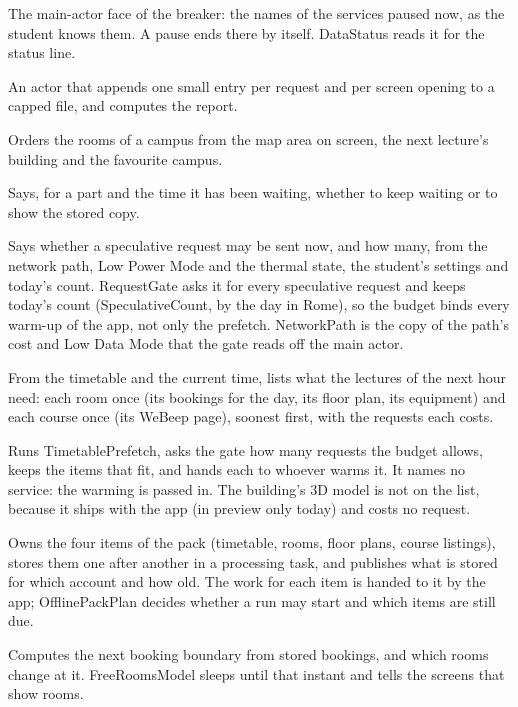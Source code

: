 \begin{description}[style=nextline, leftmargin=1.5em]
  \item[HostPauses (new)] The main-actor face of the breaker: the names of the services paused now, as the student knows them. A pause ends there by itself. DataStatus reads it for the status line.
  \item[LoadingLedger (new)] An actor that appends one small entry per request and per screen opening to a capped file, and computes the report.
  \item[RelevanceOrder (new)] Orders the rooms of a campus from the map area on screen, the next lecture's building and the favourite campus.
  \item[DeadlinePolicy (new)] Says, for a part and the time it has been waiting, whether to keep waiting or to show the stored copy.
  \item[SpeculativeBudget (new)] Says whether a speculative request may be sent now, and how many, from the network path, Low Power Mode and the thermal state, the student's settings and today's count. RequestGate asks it for every speculative request and keeps today's count (SpeculativeCount, by the day in Rome), so the budget binds every warm-up of the app, not only the prefetch. NetworkPath is the copy of the path's cost and Low Data Mode that the gate reads off the main actor.
  \item[TimetablePrefetch (new)] From the timetable and the current time, lists what the lectures of the next hour need: each room once (its bookings for the day, its floor plan, its equipment) and each course once (its WeBeep page), soonest first, with the requests each costs.
  \item[LecturePrefetch (new)] Runs TimetablePrefetch, asks the gate how many requests the budget allows, keeps the items that fit, and hands each to whoever warms it. It names no service: the warming is passed in. The building's 3D model is not on the list, because it ships with the app (in preview only today) and costs no request.
  \item[OfflinePack (new)] Owns the four items of the pack (timetable, rooms, floor plans, course listings), stores them one after another in a processing task, and publishes what is stored for which account and how old. The work for each item is handed to it by the app; OfflinePackPlan decides whether a run may start and which items are still due.
  \item[BoundaryClock (new)] Computes the next booking boundary from stored bookings, and which rooms change at it. FreeRoomsModel sleeps until that instant and tells the screens that show rooms.

\end{description}
